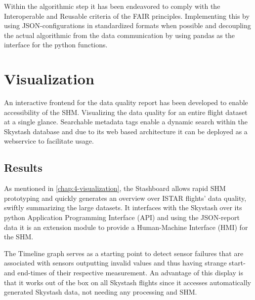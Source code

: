 Within the algorithmic step it has been endeavored to comply with the Interoperable and Reusable criteria of the FAIR principles. Implementing this by using JSON-configurations in standardized formats when possible and decoupling the actual algorithmic from the data communication by using pandas as the interface for the python functions.

%

\section{Visualization}
An interactive frontend for the data quality report has been developed to enable accessibility of the SHM. Visualizing the data quality for an entire flight dataset at a single glance. Searchable metadata tags enable a dynamic search within the Skystash database and due to its web based architecture it can be deployed as a webservice to facilitate usage.

\subsection{Results}
As mentioned in \ref{chap:4-visualization}, the Stashboard allows rapid SHM prototyping and quickly generates an overview over ISTAR flights' data quality, swiftly summarizing the large datasets. It interfaces with the Skystash over its python Application Programming Interface (API) and using the JSON-report data it is an extension module to provide a Human-Machine Interface (HMI) for the SHM.

The Timeline graph serves as a starting point to detect sensor failures that are associated with sensors outputting invalid values and thus having strange start- and end-times of their respective measurement. An advantage of this display is that it works out of the box on all Skystash flights  since it accesses automatically generated Skystash data, not needing any processing and SHM.

